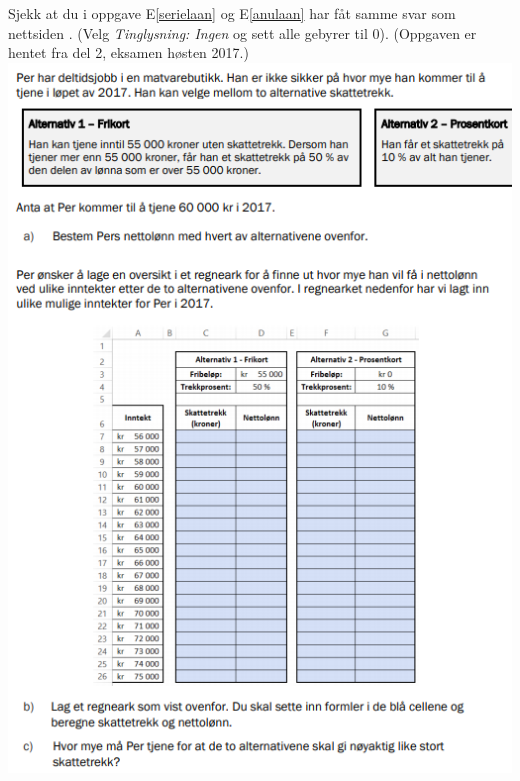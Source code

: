 Sjekk at du i oppgave E\ref{serielaan} og E\ref{anulaan} har fåt samme svar som nettsiden . (Velg \textsl{Tinglysning: Ingen} og sett alle gebyrer til 0).
\newpage
{}
(Oppgaven er hentet fra del 2, eksamen høsten 2017.)\vsk \\
\includegraphics[scale=0.9]{h17_d2_9}

